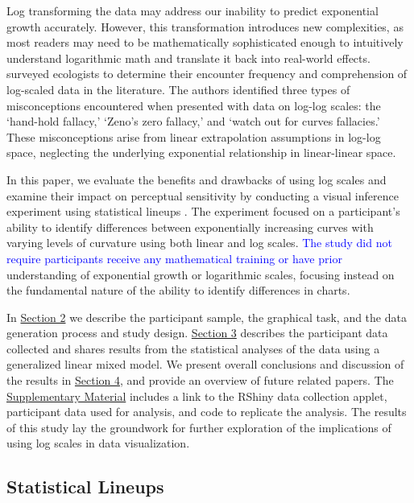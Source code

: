 \documentclass[12pt]{article}
\begin{document}
Log transforming the data may address our inability to predict
exponential growth accurately. However, this transformation introduces
new complexities, as most readers may need to be mathematically
sophisticated enough to intuitively understand logarithmic math and
translate it back into real-world effects.
\citet{menge_logarithmic_2018} surveyed ecologists to determine their
encounter frequency and comprehension of log-scaled data in the
literature. The authors identified three types of misconceptions
encountered when presented with data on log-log scales: the `hand-hold
fallacy,' `Zeno's zero fallacy,' and `watch out for curves fallacies.'
These misconceptions arise from linear extrapolation assumptions in
log-log space, neglecting the underlying exponential relationship in
linear-linear space.

In this paper, we evaluate the benefits and drawbacks of using log
scales and examine their impact on perceptual sensitivity by conducting
a visual inference experiment using statistical lineups
\citep{buja_statistical_2009}. The experiment focused on a participant's
ability to identify differences between exponentially increasing curves
with varying levels of curvature using both linear and log scales.
{\textcolor{blue}{The study did not require participants receive any mathematical training or have prior}}
understanding of exponential growth or logarithmic scales, focusing
instead on the fundamental nature of the ability to identify differences
in charts.

In \protect\hyperlink{methods}{Section 2} we describe the participant
sample, the graphical task, and the data generation process and study
design. \protect\hyperlink{results}{Section 3} describes the participant
data collected and shares results from the statistical analyses of the
data using a generalized linear mixed model. We present overall
conclusions and discussion of the results in
\protect\hyperlink{conclusion-discussion}{Section 4}, and provide an
overview of future related papers. The
\protect\hyperlink{supplementary-material}{Supplementary Material}
includes a link to the RShiny data collection applet, participant data
used for analysis, and code to replicate the analysis. The results of
this study lay the groundwork for further exploration of the
implications of using log scales in data visualization.

\hypertarget{statistical-lineups}{%
\subsection{Statistical Lineups}\label{statistical-lineups}}
\end{document}
